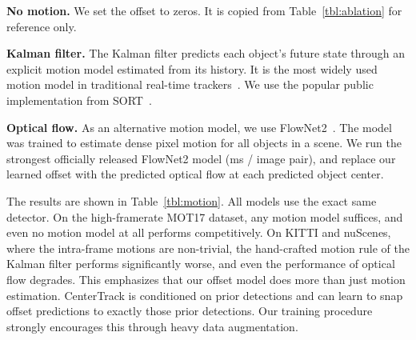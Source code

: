 \documentclass[runningheads]{llncs}
\newcommand{\reftab}[1]{Table~\ref{tbl:#1}}
\renewcommand{\paragraph}[1]{\noindent\textbf{#1}}
\begin{document}
\paragraph{No motion.} We set the offset to zeros. It is copied from \reftab{ablation} for reference only.

\paragraph{Kalman filter.} The Kalman filter predicts each object's future state through an explicit motion model estimated from its history. It is the most widely used motion model in traditional real-time trackers~\cite{Bewley2016_sort,Wojke2017simple,Weng2019_3dmot}. We use the popular public implementation from SORT~\cite{Bewley2016_sort}.


\paragraph{Optical flow.} As an alternative motion model, we use FlowNet2~\cite{ilg2017flownet}. The model was trained to estimate dense pixel motion for all objects in a scene. We run the strongest officially released FlowNet2 model (ms / image pair), and replace our learned offset with the predicted optical flow at each predicted object center.


The results are shown in \reftab{motion}.
All models use the exact same detector.
On the high-framerate MOT17 dataset, any motion model suffices, and even no motion model at all performs competitively.
On KITTI and nuScenes, where the intra-frame motions are non-trivial, the hand-crafted motion rule of the Kalman filter performs significantly worse, and even the performance of optical flow degrades.
This emphasizes that our offset model does more than just motion estimation.
CenterTrack is conditioned on prior detections and can learn to snap offset predictions to exactly those prior detections.
Our training procedure strongly encourages this through heavy data augmentation.
\end{document}
